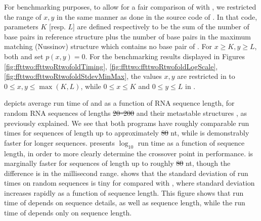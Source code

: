\documentclass[11pt, oneside]{Thesis} %
\providecommand{\DIFadd}[1]{{\protect\color{blue}\uwave{#1}}} %
\providecommand{\DIFdel}[1]{{\protect\color{red}\sout{#1}}}                      %
\providecommand{\DIFaddbegin}{} %
\providecommand{\DIFaddend}{} %
\providecommand{\DIFdelbegin}{} %
\providecommand{\DIFdelend}{} %
\begin{document}
For benchmarking purposes,
to allow for a fair comparison of \ffttwo
with \rnatwofold, we restricted the range of $x,y$ in the same manner as done in the source code of \rnatwofold.
In that code, parameters $K$ [resp. $L$] are defined respectively to be the
sum of the number of base pairs in reference structure  plus the number of base pairs in
the maximum matching (Nussinov) structure which contains
no base pair of .
For $x \geq K, y \geq L$, both \rnatwofold and \ffttwo
set $p(x,y)=0$.  For the benchmarking results displayed in
Figures \ref{fig:ffttwo:ffttwoRtwofoldTiming},
\ref{fig:ffttwo:ffttwoRtwofoldLogScale},
\ref{fig:ffttwo:ffttwoRtwofoldStdevMinMax},
the values $x,y$ are restricted in
\ffttwo to $0 \leq x,y \leq \max(K,L)$, while $0 \leq x \leq K$
and $0 \leq y \leq L$ in \rnatwofold.

 depicts average run time of \rnatwofold
and \ffttwo as a function of RNA sequence length, for random RNA
sequences of lengths \DIFdelbegin \DIFdel{20--200 }\DIFdelend \DIFaddbegin \DIFadd{$20$--$200$ }\DIFaddend and their metastable structures \strAB, as
previously explained.  We see that both programs have
roughly comparable run times for sequences of length up to approximately
\DIFdelbegin \DIFdel{80 }\DIFdelend \DIFaddbegin \DIFadd{$80$ }\DIFaddend nt, while \ffttwo is demonstrably faster for longer sequences.
presents $\log_{10}$ run time as a function of sequence length, in order
to more clearly determine the crossover point in performance.
\rnatwofold is marginally faster for sequences of
length up to roughly \DIFdelbegin \DIFdel{80 }\DIFdelend \DIFaddbegin \DIFadd{$80$ }\DIFaddend nt, though the difference is in the millisecond
range.
shows that the standard deviation of run times on random sequences is
tiny for \ffttwo compared with \rnatwofold, where standard
deviation increases rapidly as a function of sequence length. This figure
shows that run time of \rnatwofold depends on sequence details, as
well as sequence length, while the run time of \ffttwo depends only
on sequence length.
\end{document}
